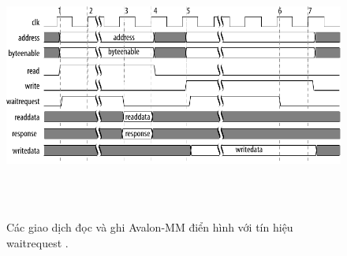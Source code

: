 \begin{figure}[htbp]
    \centering
    \includegraphics[width=\linewidth]{Images/02_01_Avalon_MM_Transfers.pdf}
    \caption{Các giao dịch đọc và ghi Avalon-MM điển hình với tín hiệu waitrequest \cite{avalon_mm_transfer}.}
    \label{fig:02_01_avalon_mm_transfer} %
\end{figure}


